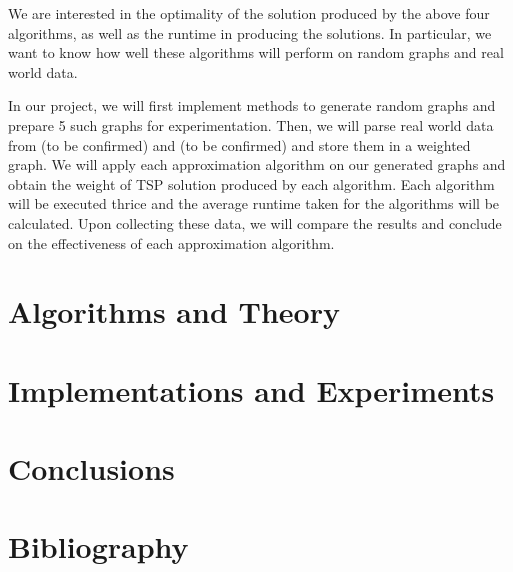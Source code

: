 \documentclass[paper=a4, fontsize=11pt]{scrartcl}	%
\numberwithin{equation}{section}		%
\numberwithin{figure}{section}			%
\numberwithin{table}{section}				%
\begin{document}
We are interested in the optimality of the solution produced by the above four algorithms, as well as the runtime in producing the solutions. In particular, we want to know how well these algorithms will perform on random graphs and real world data. 

In our project, we will first implement methods to generate random graphs and prepare 5 such graphs for experimentation. Then, we will parse real world data from (to be confirmed) and (to be confirmed) and store them in a weighted graph. We will apply each approximation algorithm on our generated graphs and obtain the weight of TSP solution produced by each algorithm. Each algorithm will be executed thrice and the average runtime taken for the algorithms will be calculated. Upon collecting these data, we will compare the results and conclude on the effectiveness of each approximation algorithm.

\section{Algorithms and Theory}

\section{Implementations and Experiments}

\section{Conclusions}

\section{Bibliography}

\nocite{*}

\end{document}
